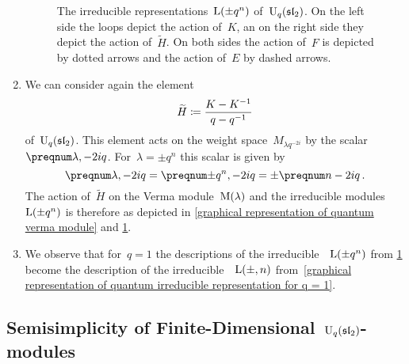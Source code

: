 \documentclass[a4paper, 11pt, oneside]{scrartcl}
\begin{document}
\begin{remark}
\begin{enumerate}
\begin{figure}[t]
\begin{center}
        \end{center}
        \caption{
          The irreducible representations~$\operatorname{L}(\pm q^n)$ of~$\operatorname{U}_q(\mathfrak{sl}_2)$.
          On the left side the loops depict the action of~$K$, an on the right side they depict the action of~$\widetilde{H}$.
          On both sides the action of~$F$ is depicted by dotted arrows and the action of~$E$ by dashed arrows.
        }
        \label{graphical representation of irreducible quantum representation}
      \end{figure}
    \item
      We can consider again the element
      \[
        \widetilde{H}
        \coloneqq
        \frac{K - K^{-1}}{q - q^{-1}}
      \]
      of~$\operatorname{U}_q(\mathfrak{sl}_2)$.
      This element acts on the weight space~$M_{\lambda q^{-2i}}$ by the scalar~$\qnum{\lambda, -2i}$.
      For~$\lambda = \pm q^n$ this scalar is given by
      \[
        \qnum{\lambda, -2i}
        =
        \qnum{\pm q^n, -2i}
        =
        \pm \qnum{n - 2i} \,.
      \]
      The action of~$\widetilde{H}$ on the Verma module~$\operatorname{M}(\lambda)$ and the irreducible modules~$\operatorname{L}(\pm q^n)$ is therefore as depicted in \cref{graphical representation of quantum verma module} and \cref{graphical representation of irreducible quantum representation}.
    \item
      We observe that for~$q = 1$ the descriptions of the irreducible~~$\operatorname{L}(\pm q^n)$ from \cref{graphical representation of irreducible quantum representation} become the description of the irreducible~~$\operatorname{L}(\pm, n)$ from~\cref{graphical representation of quantum irreducible representation for q = 1}.
  \end{enumerate}
\end{remark}



\subsection{Semisimplicity of Finite-Dimensional~\texorpdfstring{$\operatorname{U}_q(\mathfrak{sl}_2)$}{Uq(sl2)}-modules}
\end{document}
